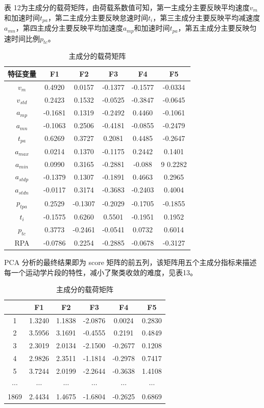 \documentclass[bwprint]{gmcmthesis}
\begin{document}
表 12为主成分的载荷矩阵，由荷载系数值可知，第一主成分主要反映平均速度$v_m$和加速时间$t_{pa}$，第二主成分主要反映怠速时间$t_i$，第三主成分主要反映平均减速度$a_{mn}$，第四主成分主要反映平均加速度$a_{mp}$和加速时间$t_{pa}$，第五主成分主要反映匀速时间比例$p_{tc}$。
\begin{table}[htbp]
\caption{主成分的载荷矩阵}
\centering
\begin{tabular}{c c c c c c}%
\hline  %
特征变量&	F1	&F2	&F3&	F4&	F5\\
\hline
$v_m$	&0.4920	&0.0157	&-0.1377	&-0.1577&	-0.0334\\
$v_{std}$	&0.2423&	0.1532&	-0.0525&	-0.3847&	-0.0645\\
$a_{mp}$	&-0.1681&	0.1319&	-0.2492&	0.4460	&-0.1061\\
$a_{mn}$	&-0.1063&	0.2506&	-0.4181&	-0.0855&	-0.2479\\
$t_{pa}$	&0.6269&	0.3727	&0.2081	&0.4485	&-0.2647\\
$a_{max}$&	0.0214&	0.1370	&-0.1175&	0.2442&	0.1401\\
$a_{min}$&	0.0990&	0.3165	&-0.2881&	-0.088&9	0.2282\\
$a_{stdp}$&	-0.1379&	0.1307	&-0.1891&	0.4663&	0.2965\\
$a_{stdn}$&	-0.0117&	0.3174	&-0.3683&	-0.2403&	0.4004\\
$p_{tpa}	$&0.2529	&-0.1307	&-0.2029&	-0.1705&	-0.1855\\
$t_i$	&-0.1575	&0.6260&	0.5501	&-0.1951&	0.1952\\
$p_{tc}$&	0.3773	&-0.2461&	-0.0541&	0.0732&	0.6014\\
RPA	&-0.0786	&0.2254	&-0.2885	&-0.0678&	-0.3127\\
\hline  %
\end{tabular}
\end{table}

PCA 分析的最终结果即为 score 矩阵的前五列，该矩阵用五个主成分指标来描述每一个运动学片段的特性，减小了聚类收敛的难度，见表13。
\begin{table}[htbp]
\caption{主成分的载荷矩阵}
\centering
\begin{tabular}{c c c c c c}%
\hline  %
&	F1	&F2	&F3&	F4&	F5\\
\hline
1&1.3240&	1.1838&	-2.0876&	0.0024&	0.2830\\
2&3.5956&	3.1691&	-0.4555&	0.2191&	0.4849\\
3&2.3019&	2.0134&	-2.1500&	-0.2677&	0.1208\\
4&2.9826&	2.3511&	-1.1814&	-0.2978&	0.7417\\
5&3.7244&	2.0199&	-2.2644&	-0.3638&	1.4108\\
$\cdots$&	$\cdots$ &$\cdots$	&$\cdots$ &	$\cdots$&$\cdots$\\
1869&2.4434	&1.4675	&-1.6804&	-0.2625&	0.6869\\

\hline  %
\end{tabular}
\end{table}
\end{document}
